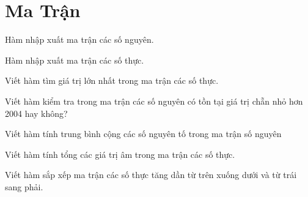 \chapter{Ma Trận}
\hypertarget{localtoc\thechapter}{}
\localtoc

\begin{problem}
    Hàm nhập xuất ma trận các số nguyên.
\end{problem}
\begin{problem}
    Hàm nhập xuất ma trận các số thực.
\end{problem}
\begin{problem}
    Viết hàm tìm giá trị lớn nhất trong ma trận các số thực.
\end{problem}
\begin{problem}
    Viết hàm kiểm tra trong ma trận các số nguyên có tồn tại giá trị chẵn nhỏ hơn 2004 hay không?
\end{problem}
\begin{problem}
     Viết hàm tính trung bình cộng các số nguyên tố trong ma trận số nguyên
\end{problem}
\begin{problem}
    Viết hàm tính tổng các giá trị âm trong ma trận các số thực.
\end{problem}
\begin{problem}
    Viết hàm sắp xếp ma trận các số thực tăng dần từ trên xuống dưới và từ trái sang phải.
\end{problem}

